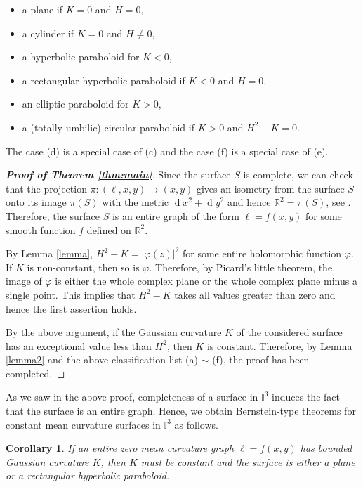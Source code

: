 \documentclass[12pt,a4paper,reqno]{amsart}
\theoremstyle{plain} %
\newtheorem{corollary}[theorem]{Corollary}
\theoremstyle{definition}
\begin{document}
\begin{itemize}
\item[(a)]  a plane if  $K=0$ and $H=0$,
\item[(b)]  a cylinder if  $K=0$ and $H\neq 0$,
\item[(c)]  a hyperbolic  paraboloid for $K<0$, 
\item[(d)]  a rectangular  hyperbolic paraboloid if $K < 0$ and $H=0$,
 \item[(e)]  an elliptic  paraboloid for $K>0$,
\item[(f)] a (totally umbilic) circular  paraboloid if $K > 0$ and $H^2-K=0$.
\end{itemize}

The case (d) is a special case of (c) and the case (f) is a special case of (e).

\begin{proof}[{\bf Proof of Theorem \ref{thm:main}}]
Since the surface $S$ is complete, we can check that the projection $\pi\colon (\ell,x,y)\mapsto (x,y)$ gives an isometry from the surface $S$ onto its image $\pi(S)$ with the metric $\operatorname{d}\!x^2+\operatorname{d}\!y^2$ and hence $\mathbb{R}^2=\pi(S)$, see \cite[Theorem 5.1]{S1}. Therefore, the surface $S$ is an entire graph of the form $\ell=f(x,y)$ for some smooth function $f$ defined on $\mathbb{R}^2$.

 By Lemma \ref{lemma}, $H^2-K=|\varphi(z)|^2$ for some entire holomorphic function $\varphi$. If $K$ is non-constant, then so is $\varphi$. Therefore, by  Picard's little theorem, the image of $\varphi$ is either the whole complex plane or the whole complex plane minus a single point. This implies that $H^2-K$ takes all values greater than zero and hence the first assertion holds. 
 
 By the above argument, if the Gaussian curvature $K$ of the considered surface has an exceptional value less than $H^2$, then $K$ is constant. Therefore, by Lemma \ref{lemma2} and the above classification list (a) $\sim$ (f), the proof has been completed.
\end{proof}

As we saw in the above proof, completeness of a surface in $\mathbb{I}^3$ induces the fact that the surface is an entire graph. Hence, we obtain Bernstein-type theorems for constant mean curvature surfaces in $\mathbb{I}^3$ as follows.

\begin{corollary}\label{cor1}
If an entire zero mean curvature graph $\ell=f(x,y)$ has bounded Gaussian curvature $K$, then $K$ must be constant and the surface is either a plane or a rectangular hyperbolic paraboloid.
\end{corollary}
\end{document}
